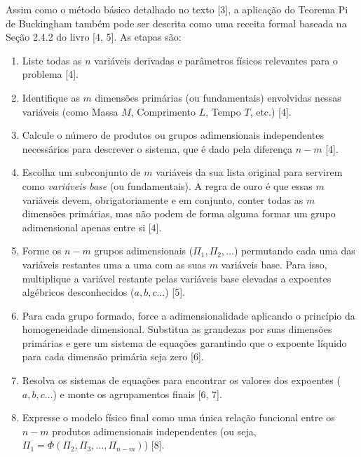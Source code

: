 Assim como o método básico detalhado no texto [3], a aplicação do Teorema Pi de Buckingham também pode ser descrita como uma receita formal baseada na Seção 2.4.2 do livro [4, 5]. As etapas são:

\begin{enumerate}
    \item[\textbf{a.}] Liste todas as $n$ variáveis derivadas e parâmetros físicos relevantes para o problema [4].
    \item[\textbf{b.}] Identifique as $m$ dimensões primárias (ou fundamentais) envolvidas nessas variáveis (como Massa $M$, Comprimento $L$, Tempo $T$, etc.) [4].
    \item[\textbf{c.}] Calcule o número de produtos ou grupos adimensionais independentes necessários para descrever o sistema, que é dado pela diferença $n - m$ [4].
    \item[\textbf{d.}] Escolha um subconjunto de $m$ variáveis da sua lista original para servirem como \textit{variáveis base} (ou fundamentais). A regra de ouro é que essas $m$ variáveis devem, obrigatoriamente e em conjunto, conter todas as $m$ dimensões primárias, mas não podem de forma alguma formar um grupo adimensional apenas entre si [4].
    \item[\textbf{e.}] Forme os $n - m$ grupos adimensionais ($\Pi_1, \Pi_2, \dots$) permutando cada uma das variáveis restantes uma a uma com as suas $m$ variáveis base. Para isso, multiplique a variável restante pelas variáveis base elevadas a expoentes algébricos desconhecidos ($a, b, c \dots$) [5].
    \item[\textbf{f.}] Para cada grupo formado, force a adimensionalidade aplicando o princípio da homogeneidade dimensional. Substitua as grandezas por suas dimensões primárias e gere um sistema de equações garantindo que o expoente líquido para cada dimensão primária seja zero [6].
    \item[\textbf{g.}] Resolva os sistemas de equações para encontrar os valores dos expoentes ($a, b, c \dots$) e monte os agrupamentos finais [6, 7].
    \item[\textbf{h.}] Expresse o modelo físico final como uma única relação funcional entre os $n - m$ produtos adimensionais independentes (ou seja, $\Pi_1 = \Phi(\Pi_2, \Pi_3, \dots, \Pi_{n-m})$) [8].
\end{enumerate}
